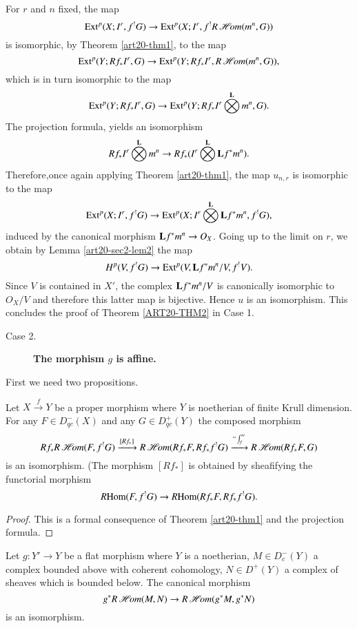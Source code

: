 For $r$ and $n$ fixed, the map
$$
\operatorname{\mathrm{Ext}}^{p}(X;I^{r},f^{!}G)\to \operatorname{\mathrm{Ext}}^{p}(X;I^{r},f^{!}R\operatorname{\mathscr{H}\!\textit{om}}(m^{n},G))
$$
is isomorphic, by Theorem \ref{art20-thm1}, to the map 
$$
\operatorname{\mathrm{Ext}}^{p}(Y;Rf_{*}I^{r},G)\to \operatorname{\mathrm{Ext}}^{p}(Y;Rf_{*}I^{r},R\operatorname{\mathscr{H}\!\textit{om}}(m^{n},G)),
$$
which is in turn isomorphic to the map
$$
\operatorname{\mathrm{Ext}}^{p}(Y;Rf_{*}I^{r},G)\to \operatorname{\mathrm{Ext}}^{p}(Y;Rf_{*}I^{r}\bigotimes\limits^{\mathbf{L}}m^{n},G).
$$
The projection formula, yields an isomorphism
$$
Rf_{*}I^{r}\bigotimes\limits^{\mathbf{L}}m^{n}\to Rf_{*}(I^{r}\bigotimes\limits^{\mathbf{L}}\mathbf{L} f^{*}m^{n}).
$$
Therefore,\pageoriginale once again applying Theorem \ref{art20-thm1}, the map $u_{n,r}$ is isomorphic to the map
$$
\operatorname{\mathrm{Ext}}^{p}(X;I^{r},f^{!}G)\to \operatorname{\mathrm{Ext}}^{p}(X;I^{r}\bigotimes\limits^{\mathbf{L}}\mathbf{L} f^{*}m^{n},f^{!}G),
$$
induced by the canonical morphism $\mathbf{L} f^{*}m^{n}\to O_{X}$. Going up to the limit on $r$, we obtain by Lemma \ref{art20-sec2-lem2} the map
$$
H^{p}(V,f^{!}G)\to \operatorname{\mathrm{Ext}}^{p}(V,\mathbf{L} f^{*}m^{n}/V,f^{!}V).
$$
Since $V$ is contained in $X'$, the complex $\mathbf{L} f^{*}m^{n}/V$ is canonically isomorphic to $O_{X}/V$ and therefore this latter map is bijective. Hence $u$ is an isomorphism. This concludes the proof of Theorem \ref{ART20-THM2} in Case 1.
\begin{description}
\item[Case 2.] {\bf The morphism \boldmath$g$ is affine.}
\end{description}

First we need two propositions.

\begin{proposition}\label{art20-sec2-prop3}
Let $X\xrightarrow{f}Y$ be a proper morphism where $Y$ is noetherian of finite Krull dimension. For any $F\in D^{-}_{qc}(X)$ and any $G\in D^{+}_{qc}(Y)$ the composed morphism 
{\fontsize{10pt}{12pt}\selectfont
$$
Rf_{*}R\operatorname{\mathscr{H}\!\textit{om}}(F,f^{!}G)\xrightarrow{[Rf_{*}]}R\operatorname{\mathscr{H}\!\textit{om}} (Rf_{*}F, Rf_{*}f^{!}G)\xrightarrow{``\int_{f}''}R\operatorname{\mathscr{H}\!\textit{om}}(Rf_{*}F,G)
$$}\relax
is an isomorphism. (The morphism $[Rf_{*}]$ is obtained by sheafifying the functorial morphism
$$
\operatorname{\textit{R}\mathrm{Hom}} (F,f^{!}G)\to \operatorname{\textit{R}\mathrm{Hom}}(Rf_{*}F,Rf_{*}f^{!}G).
$$
\end{proposition}

\begin{proof}
This is a formal consequence of Theorem \ref{art20-thm1} and the projection formula.
\end{proof}

\begin{proposition}\label{art20-sec2-prop4}
Let $g:Y'\to Y$ be a flat morphism where $Y$ is a noetherian, $M\in D^{-}_{c}(Y)$ a complex bounded above with coherent cohomology, $N\in D^{+}(Y)$ a complex of sheaves which is bounded below. The canonical morphism
$$
g^{*}R\operatorname{\mathscr{H}\!\textit{om}}(M,N)\to R\operatorname{\mathscr{H}\!\textit{om}}(g^{*}M,g^{*}N)
$$
is an isomorphism.
\end{proposition}

